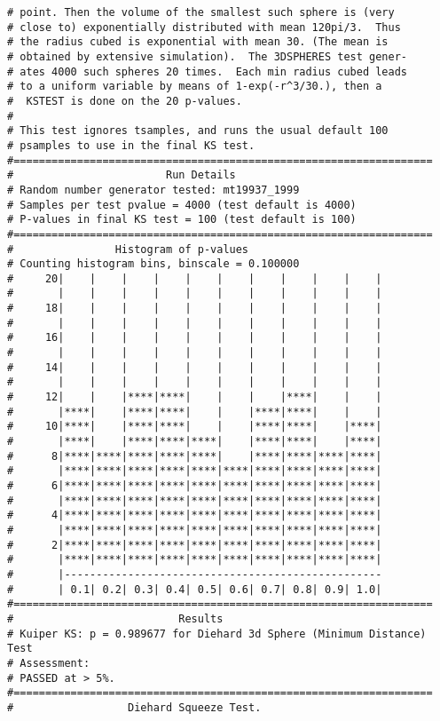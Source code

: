 \documentclass[12pt]{book}
\begin{document}
\begin{verbatim}
# point. Then the volume of the smallest such sphere is (very   
# close to) exponentially distributed with mean 120pi/3.  Thus  
# the radius cubed is exponential with mean 30. (The mean is    
# obtained by extensive simulation).  The 3DSPHERES test gener- 
# ates 4000 such spheres 20 times.  Each min radius cubed leads 
# to a uniform variable by means of 1-exp(-r^3/30.), then a     
#  KSTEST is done on the 20 p-values.                           
#
# This test ignores tsamples, and runs the usual default 100
# psamples to use in the final KS test.
#==================================================================
#                        Run Details
# Random number generator tested: mt19937_1999
# Samples per test pvalue = 4000 (test default is 4000)
# P-values in final KS test = 100 (test default is 100)
#==================================================================
#                Histogram of p-values
# Counting histogram bins, binscale = 0.100000
#     20|    |    |    |    |    |    |    |    |    |    |
#       |    |    |    |    |    |    |    |    |    |    |
#     18|    |    |    |    |    |    |    |    |    |    |
#       |    |    |    |    |    |    |    |    |    |    |
#     16|    |    |    |    |    |    |    |    |    |    |
#       |    |    |    |    |    |    |    |    |    |    |
#     14|    |    |    |    |    |    |    |    |    |    |
#       |    |    |    |    |    |    |    |    |    |    |
#     12|    |    |****|****|    |    |    |****|    |    |
#       |****|    |****|****|    |    |****|****|    |    |
#     10|****|    |****|****|    |    |****|****|    |****|
#       |****|    |****|****|****|    |****|****|    |****|
#      8|****|****|****|****|****|    |****|****|****|****|
#       |****|****|****|****|****|****|****|****|****|****|
#      6|****|****|****|****|****|****|****|****|****|****|
#       |****|****|****|****|****|****|****|****|****|****|
#      4|****|****|****|****|****|****|****|****|****|****|
#       |****|****|****|****|****|****|****|****|****|****|
#      2|****|****|****|****|****|****|****|****|****|****|
#       |****|****|****|****|****|****|****|****|****|****|
#       |--------------------------------------------------
#       | 0.1| 0.2| 0.3| 0.4| 0.5| 0.6| 0.7| 0.8| 0.9| 1.0|
#==================================================================
#                          Results
# Kuiper KS: p = 0.989677 for Diehard 3d Sphere (Minimum Distance) Test
# Assessment:
# PASSED at > 5%.
#==================================================================
#                  Diehard Squeeze Test.

\end{verbatim}
\end{document}

